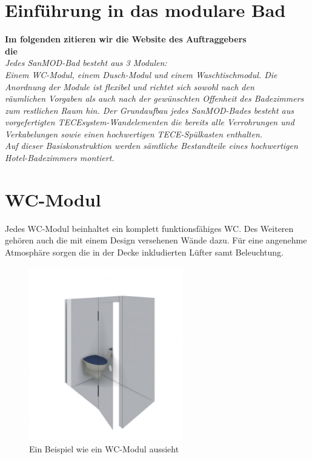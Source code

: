 \section{Einführung in das modulare Bad}\label{sec:sanMOD}

\textbf{Im folgenden zitieren wir die Website des Auftraggebers \\die {\projectpartner}} \cite{SanMOD} \\
\textit{
Jedes SanMOD-Bad besteht aus 3 Modulen: \\
Einem WC-Modul, einem Dusch-Modul und einem Waschtischmodul. Die Anordnung der Module ist flexibel und richtet sich sowohl nach den \\räumlichen Vorgaben als auch nach der gewünschten Offenheit des Badezimmers zum restlichen Raum hin. Der Grundaufbau jedes SanMOD-Bades besteht aus vorgefertigten TECEsystem-Wandelementen die bereits alle Verrohrungen und Verkabelungen sowie einen hochwertigen TECE-Spülkasten enthalten.
\\
Auf dieser Basiskonstruktion werden sämtliche Bestandteile eines hochwertigen Hotel-Badezimmers montiert.
}
\section*{WC-Modul}
Jedes WC-Modul beinhaltet ein komplett funktionsfähiges WC. Des Weiteren gehören auch die mit einem Design versehenen Wände dazu. Für eine angenehme Atmosphäre sorgen die in der Decke inkludierten Lüfter samt Beleuchtung.

\begin{figure}[h]
    \centering
    \includegraphics[width=0.6\textwidth]{images/Modul-WC-600x676.jpg}
    \caption{Ein Beispiel wie ein WC-Modul aussieht \cite{SanMOD}}
    \label{}
\end{figure}
    

